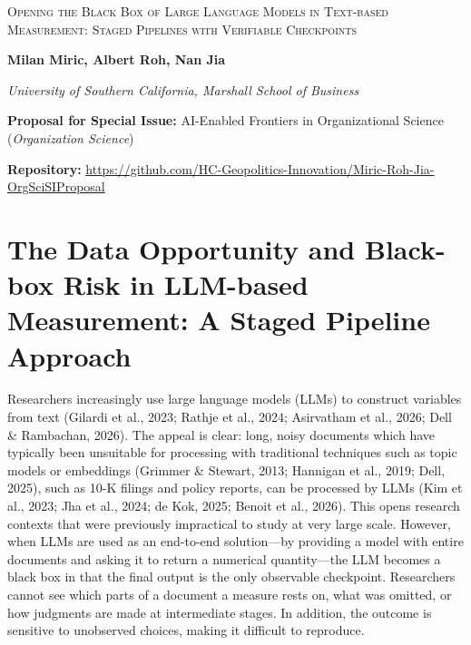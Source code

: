\documentclass[11pt]{article}
\begin{document}
\begin{center}
    {\LARGE \textsc{Opening the Black Box of Large Language Models in Text-based Measurement: Staged Pipelines with Verifiable Checkpoints}\par}
    \vspace{1.2em}
    {\normalsize\bfseries Milan Miric, Albert Roh, Nan Jia\par}
    \vspace{0.2em}
    {\small\itshape University of Southern California, Marshall School of Business\par}
    \vspace{0.8em}
    {\footnotesize\textbf{Proposal for Special Issue:} AI-Enabled Frontiers in Organizational Science (\textit{Organization Science})\par}
    \vspace{0.3em}
    {\footnotesize\textbf{Repository:} \url{https://github.com/HC-Geopolitics-Innovation/Miric-Roh-Jia-OrgSciSIProposal}\par}
\end{center}

\vspace{1.5em}

\section{The Data Opportunity and Black-box Risk in LLM-based Measurement: A Staged Pipeline Approach}

Researchers increasingly use large language models (LLMs) to construct variables from text (Gilardi et al., 2023; Rathje et al., 2024; Asirvatham et al., 2026; Dell \& Rambachan, 2026). The appeal is clear: long, noisy documents which have typically been unsuitable for processing with traditional techniques such as topic models or embeddings (Grimmer \& Stewart, 2013; Hannigan et al., 2019; Dell, 2025), such as 10-K filings and policy reports, can be processed by LLMs (Kim et al., 2023; Jha et al., 2024; de Kok, 2025; Benoit et al., 2026). This opens research contexts that were previously impractical to study at very large scale. However, when LLMs are used as an end-to-end solution---by providing a model with entire documents and asking it to return a numerical quantity---the LLM becomes a black box in that the final output is the only observable checkpoint. Researchers cannot see which parts of a document a measure rests on, what was omitted, or how judgments are made at intermediate stages. In addition, the outcome is sensitive to unobserved choices, making it difficult to reproduce.
\end{document}
